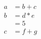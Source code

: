 \documentclass[preview]{standalone}
\begin{document}
\begin{align*}
a &= b + c \\ b &= d * e \\ &= 5 \\ c &= f + g
\end{align*}
\end{document}
